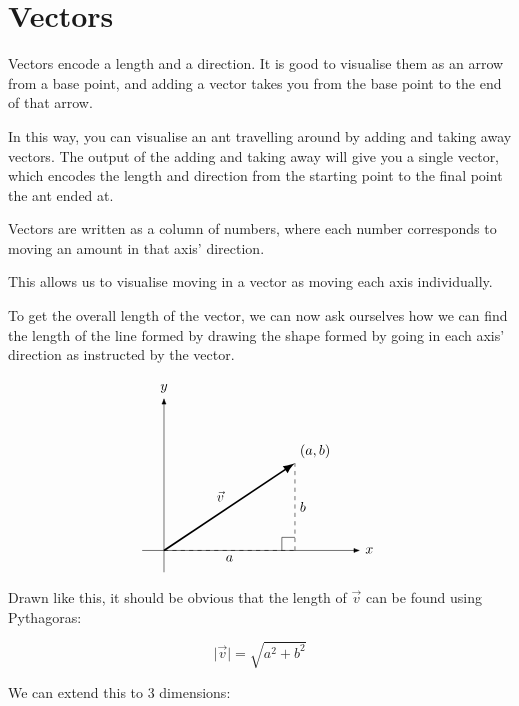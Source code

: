\section{Vectors}\label{sec:vectors}

Vectors encode a length and a direction. It is good to visualise them as an arrow from a base point, and adding a vector takes you from the base point to the end of that arrow.

In this way, you can visualise an ant travelling around by adding and taking away vectors. 
The output of the adding and taking away will give you a single vector, which encodes the length and direction from the starting point to the final point the ant ended at.

Vectors are written as a column of numbers, where each number corresponds to moving an amount in that axis' direction. 

This allows us to visualise moving in a vector as moving each axis individually.

To get the overall length of the vector, we can now ask ourselves how we can find the length of the line formed by drawing the shape formed by going in each axis' direction as instructed by the vector.

\[
\begin{tikzpicture}[scale=1.1, >=Latex]

    \draw[->] (-0.5,0) -- (4.5,0) node[right] {$x$};
    \draw[->] (0,-0.5) -- (0,3.5) node[above] {$y$};

    \coordinate (O) at (0,0);
    \coordinate (A) at (3,0);
    \coordinate (B) at (3,2);

    \draw[dashed] (O) -- (A);
    \draw[dashed] (A) -- (B);

    \draw[very thick,->] (O) -- (B) node[midway, above left] {$\vec{v}$};

    \node[below] at (1.5,0) {$a$};
    \node[right] at (3,1) {$b$};

    \node[above right] at (B) {$(a,b)$};

    \draw (2.7,0) -- (2.7,0.3) -- (3,0.3);

\end{tikzpicture}
\]
Drawn like this, it should be obvious that the length of $\vec{v}$ can be found using Pythagoras:

\[ \vert\vec{v}\vert = \sqrt{a^2 + b^2}\]

We can extend this to 3 dimensions:

